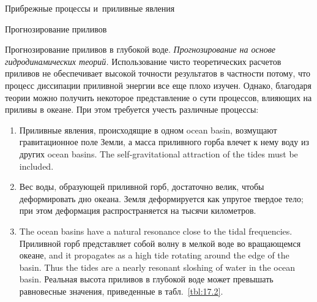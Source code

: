 \begin{chapter}{Прибрежные процессы и~приливные явления}
\begin{section}{Прогнозирование приливов}
\begin{paragraph}{Прогнозирование приливов в глубокой воде.}
\emph{Прогнозирование на основе гидродинамических теорий.} 
Использование чисто теоретических расчетов%
приливов не обеспечивает высокой точности результатов в частности потому,
что процесс диссипации приливной энергии все еще плохо изучен. 
Однако, благодаря теории можно получить некоторое представление о сути 
процессов, влияющих на приливы в океане. При этом требуется учесть различные
процессы:
%

\begin{enumerate}
\item 
Приливные явления, происходящие в одном ocean basin, возмущают
гравитационное поле Земли, а масса приливного горба влечет к нему воду
из других ocean basins. 
The self-gravitational attraction of the tides must be included.
%

\item 
Вес воды, образующей приливной горб, достаточно велик, чтобы деформировать
дно океана. Земля деформируется как упругое твердое тело; при этом деформация
распространяется на тысячи километров.
%

\item 
The ocean basins have a natural resonance close to the tidal
frequencies. Приливной горб представляет собой волну в мелкой воде во
вращающемся океане, 
and it propagates as a high tide rotating around the edge of
the basin. Thus the tides are a nearly resonant sloshing of water in
the ocean basin. 
Реальная высота приливов в глубокой воде может превышать равновесные значения,
приведенные в табл.~\ref{tbl:17.2}.
%


\end{enumerate}
\end{paragraph}
\end{section}
\end{chapter}
